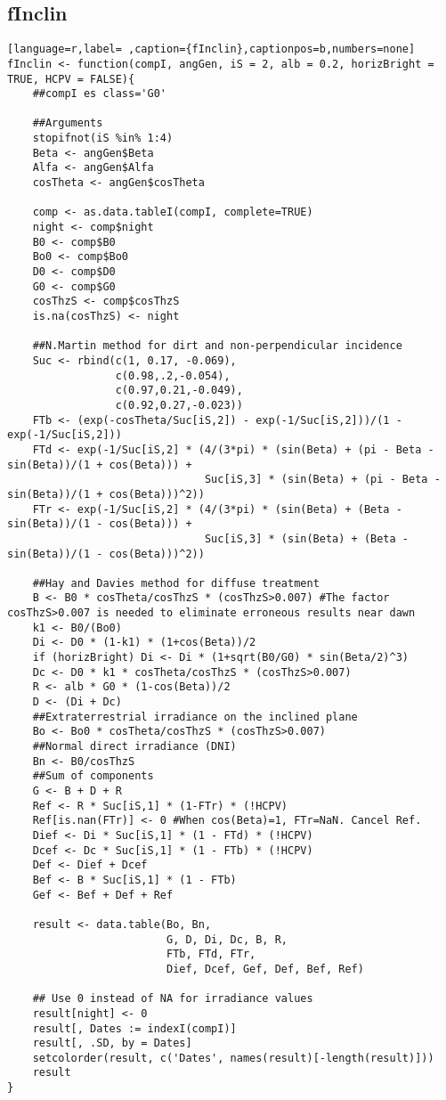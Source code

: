 \subsection{fInclin}
\label{sec:orgf2539d1}
\label{subsec:finclin}
\begin{lstlisting}[language=r,label= ,caption={fInclin},captionpos=b,numbers=none]
fInclin <- function(compI, angGen, iS = 2, alb = 0.2, horizBright = TRUE, HCPV = FALSE){
    ##compI es class='G0'

    ##Arguments
    stopifnot(iS %in% 1:4)
    Beta <- angGen$Beta
    Alfa <- angGen$Alfa
    cosTheta <- angGen$cosTheta

    comp <- as.data.tableI(compI, complete=TRUE)
    night <- comp$night
    B0 <- comp$B0
    Bo0 <- comp$Bo0
    D0 <- comp$D0
    G0 <- comp$G0
    cosThzS <- comp$cosThzS
    is.na(cosThzS) <- night

    ##N.Martin method for dirt and non-perpendicular incidence
    Suc <- rbind(c(1, 0.17, -0.069),
                 c(0.98,.2,-0.054),
                 c(0.97,0.21,-0.049),
                 c(0.92,0.27,-0.023))
    FTb <- (exp(-cosTheta/Suc[iS,2]) - exp(-1/Suc[iS,2]))/(1 - exp(-1/Suc[iS,2]))
    FTd <- exp(-1/Suc[iS,2] * (4/(3*pi) * (sin(Beta) + (pi - Beta - sin(Beta))/(1 + cos(Beta))) +
                               Suc[iS,3] * (sin(Beta) + (pi - Beta - sin(Beta))/(1 + cos(Beta)))^2))
    FTr <- exp(-1/Suc[iS,2] * (4/(3*pi) * (sin(Beta) + (Beta - sin(Beta))/(1 - cos(Beta))) +
                               Suc[iS,3] * (sin(Beta) + (Beta - sin(Beta))/(1 - cos(Beta)))^2))

    ##Hay and Davies method for diffuse treatment
    B <- B0 * cosTheta/cosThzS * (cosThzS>0.007) #The factor cosThzS>0.007 is needed to eliminate erroneous results near dawn
    k1 <- B0/(Bo0)
    Di <- D0 * (1-k1) * (1+cos(Beta))/2
    if (horizBright) Di <- Di * (1+sqrt(B0/G0) * sin(Beta/2)^3)
    Dc <- D0 * k1 * cosTheta/cosThzS * (cosThzS>0.007)
    R <- alb * G0 * (1-cos(Beta))/2
    D <- (Di + Dc)
    ##Extraterrestrial irradiance on the inclined plane
    Bo <- Bo0 * cosTheta/cosThzS * (cosThzS>0.007) 
    ##Normal direct irradiance (DNI)
    Bn <- B0/cosThzS
    ##Sum of components
    G <- B + D + R
    Ref <- R * Suc[iS,1] * (1-FTr) * (!HCPV)
    Ref[is.nan(FTr)] <- 0 #When cos(Beta)=1, FTr=NaN. Cancel Ref.
    Dief <- Di * Suc[iS,1] * (1 - FTd) * (!HCPV)
    Dcef <- Dc * Suc[iS,1] * (1 - FTb) * (!HCPV)
    Def <- Dief + Dcef
    Bef <- B * Suc[iS,1] * (1 - FTb)
    Gef <- Bef + Def + Ref

    result <- data.table(Bo, Bn,
                         G, D, Di, Dc, B, R,
                         FTb, FTd, FTr,
                         Dief, Dcef, Gef, Def, Bef, Ref) 

    ## Use 0 instead of NA for irradiance values
    result[night] <- 0
    result[, Dates := indexI(compI)]
    result[, .SD, by = Dates]
    setcolorder(result, c('Dates', names(result)[-length(result)]))
    result
}
\end{lstlisting}
